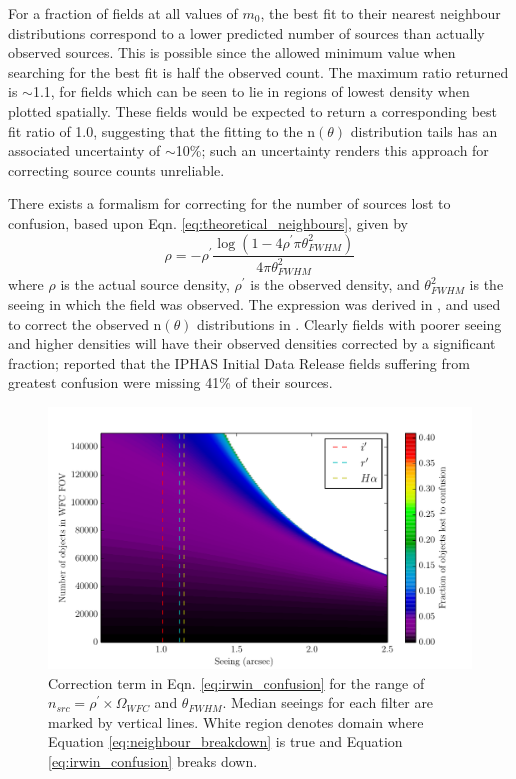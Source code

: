 \documentclass[a4paper,useAMS,usenatbib]{mn2e}
\begin{document}
For a fraction of fields at all values of $m_0$, the best fit to their nearest
neighbour distributions correspond to a lower predicted number of sources than
actually observed sources. This is possible since the allowed minimum value when searching for the best fit is half the observed count. The maximum ratio
returned is $\sim$1.1, for fields which can be seen to lie in regions of lowest
density when plotted spatially. These fields would be expected to return a
corresponding best fit ratio of 1.0, suggesting that the fitting to the
n$(\theta)$ distribution tails has an associated uncertainty of $\sim$10\%; such an uncertainty renders this approach for correcting source counts unreliable.

There exists a formalism for correcting for the number of sources lost to 
confusion, based upon Eqn. \ref{eq:theoretical_neighbours}, given by
\begin{equation}
\rho = - \rho^{\prime}\frac{\log\left(1-4\rho^{\prime}\pi\theta_{FWHM}^2\right)}{4\pi\theta_{FWHM}^2}
\label{eq:irwin_confusion}
\end{equation}
\noindent where $\rho$ is the actual source density, $\rho^{\prime}$ is the observed density, and $\theta_{FWHM}^2$ is the seeing in which the field was observed. The expression was derived in \cite{Irwin1984}, and used to correct the observed n$(\theta)$ distributions in \citet{Gonzalez-Solares2008}. Clearly fields with poorer seeing and higher densities will have their observed densities corrected by a significant fraction; \citep{Gonzalez-Solares2008} reported that the IPHAS Initial Data Release fields suffering from greatest confusion were missing 41\% of their sources.

\begin{figure}
\begin{center}
\includegraphics[width=1\linewidth]{figures/neighbour_breakdown.pdf} 
\caption{\footnotesize Correction term in Eqn. \ref{eq:irwin_confusion} for the range of $n_{src} = \rho^{\prime} \times \Omega_{WFC}$ and $\theta_{FWHM}$. Median seeings for each filter are marked by vertical lines. White region denotes domain where Equation \ref{eq:neighbour_breakdown} is true and Equation \ref{eq:irwin_confusion} breaks down.}
\label{fig:neighbour_breakdown}
\end{center}
\end{figure}
\end{document}
